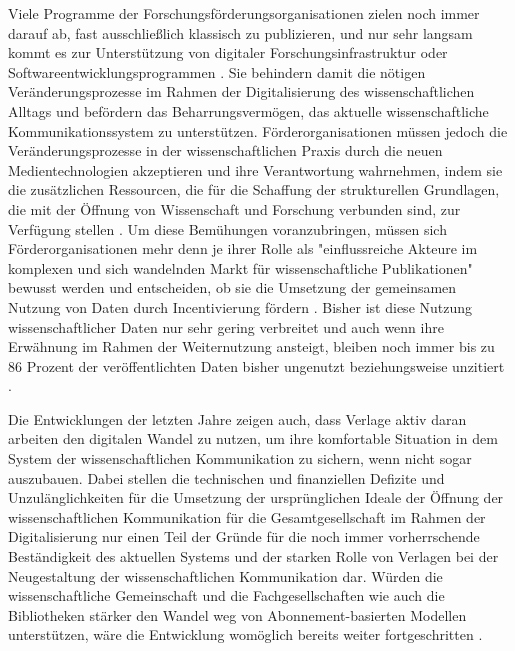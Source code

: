 Viele Programme der Forschungsförderungsorganisationen zielen noch immer darauf ab, fast ausschließlich klassisch zu publizieren, und nur sehr langsam kommt es zur Unterstützung von digitaler Forschungsinfrastruktur oder Softwareentwicklungsprogrammen \cite{Hey_2015}. Sie behindern damit die nötigen Veränderungsprozesse im Rahmen der Digitalisierung des wissenschaftlichen Alltags und befördern das Beharrungsvermögen, das aktuelle wissenschaftliche Kommunikationssystem zu unterstützen. Förderorganisationen müssen jedoch die Veränderungsprozesse in der wissenschaftlichen Praxis durch die neuen Medientechnologien akzeptieren und ihre Verantwortung wahrnehmen, indem sie die zusätzlichen Ressourcen, die für die Schaffung der strukturellen Grundlagen, die mit der Öffnung von Wissenschaft und Forschung verbunden sind, zur Verfügung stellen \cite{mennes_2013_making_os} \cite{patlak_2010_open}. Um diese Bemühungen voranzubringen, müssen sich Förderorganisationen mehr denn je ihrer Rolle als "einflussreiche Akteure im komplexen und sich wandelnden Markt für wissenschaftliche Publikationen" \cite{wein_2010_erwerbung} bewusst werden und entscheiden, ob sie die Umsetzung der gemeinsamen Nutzung von Daten durch Incentivierung fördern \cite{mennes_2013_making_os}. Bisher ist diese Nutzung wissenschaftlicher Daten nur sehr gering verbreitet und auch wenn ihre Erwähnung im Rahmen der Weiternutzung ansteigt, bleiben noch immer bis zu 86 Prozent der veröffentlichten Daten bisher ungenutzt beziehungsweise unzitiert \cite{Peters_2015}.

Die Entwicklungen der letzten Jahre zeigen auch, dass Verlage aktiv daran arbeiten den digitalen Wandel zu nutzen, um ihre komfortable Situation in dem System der wissenschaftlichen Kommunikation zu sichern, wenn nicht sogar auszubauen. Dabei stellen die technischen und finanziellen Defizite und Unzulänglichkeiten für die Umsetzung der ursprünglichen Ideale der Öffnung der wissenschaftlichen Kommunikation für die Gesamtgesellschaft im Rahmen der Digitalisierung nur einen Teil der Gründe für die noch immer vorherrschende Beständigkeit des aktuellen Systems und der starken Rolle von Verlagen bei der Neugestaltung der wissenschaftlichen Kommunikation dar. Würden die wissenschaftliche Gemeinschaft und die Fachgesellschaften wie auch die Bibliotheken stärker den Wandel weg von Abonnement-basierten Modellen unterstützen, wäre die Entwicklung womöglich bereits weiter fortgeschritten \cite{nosek_2012_scientific}.

